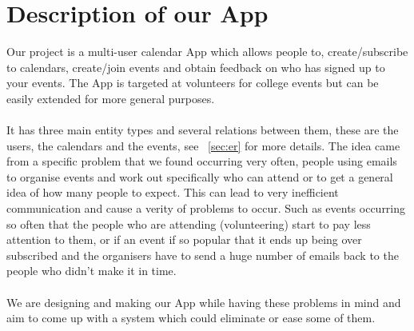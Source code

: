 \documentclass[10pt,a4paper]{article}
\begin{document}
\section{Description of our App}
Our project is a multi-user calendar App which allows people to, create/subscribe to calendars, create/join events and obtain feedback on who has signed up to your events. The App is targeted at volunteers for college events but can be easily extended for more general purposes.
\\
\\
\noindent
It has three main entity types and several relations between them, these are the users, the calendars and the events, see ~\cref{sec:er} for more details. The idea came from a specific problem that we found occurring very often, people using emails to organise events and work out specifically who can attend or to get a general idea of how many people to expect. This can lead to very inefficient communication and cause a verity of problems to occur. Such as events occurring so often that the people who are attending (volunteering) start to pay less attention to them, or if an event if so popular that it ends up being over subscribed and the organisers have to send a huge number of emails back to the people who didn't make it in time.
\\
\\
\noindent
We are designing and making our App while having these problems in mind and aim to come up with a system which could eliminate or ease some of them.
\end{document}
